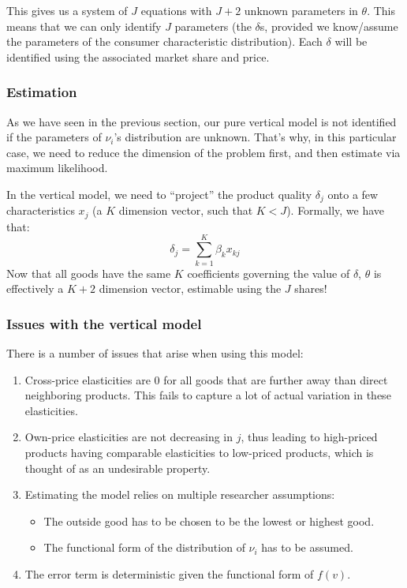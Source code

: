 This gives us a system of $J$ equations with $J+2$ unknown parameters in $\theta$. This means that we can only identify $J$ parameters (the $\delta$s, provided we know/assume the parameters of the consumer characteristic distribution). Each $\delta$ will be identified using the associated market share and price.

\subsubsection{Estimation}

As we have seen in the previous section, our pure vertical model is not identified if the parameters of $\nu_i$'s distribution are unknown. That's why, in this particular case, we need to reduce the dimension of the problem first, and then estimate via maximum likelihood.

In the vertical model, we need to ``project'' the product quality $\delta_j$ onto a few characteristics $x_j$ (a $K$ dimension vector, such that $K < J$). Formally, we have that: $$ \delta_j = \sum_{k=1}^{K} \beta_k x_{kj} $$ Now that all goods have the same $K$ coefficients governing the value of $\delta$, $\theta$ is effectively a $K+2$ dimension vector, estimable using the $J$ shares!

\subsubsection{Issues with the vertical model}

There is a number of issues that arise when using this model:\begin{enumerate}
\item Cross-price elasticities are 0 for all goods that are further away than direct neighboring products. This fails to capture a lot of actual variation in these elasticities.
\item Own-price elasticities are not decreasing in $j$, thus leading to high-priced products having comparable elasticities to low-priced products, which is thought of as an undesirable property.
\item Estimating the model relies on multiple researcher assumptions:\begin{itemize}
\item The outside good has to be chosen to be the lowest or highest good.
\item The functional form of the distribution of $\nu_i$ has to be assumed.
\end{itemize}
\item The error term is deterministic given the functional form of $f(v)$.
\end{enumerate}

